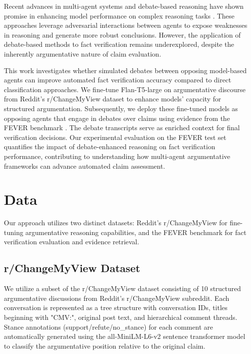 \documentclass[11pt]{article}
\begin{document}
Recent advances in multi-agent systems and debate-based reasoning have shown promise in enhancing model performance on complex reasoning tasks \cite{du2023improving, liang2023encouraging}. These approaches leverage adversarial interactions between agents to expose weaknesses in reasoning and generate more robust conclusions. However, the application of debate-based methods to fact verification remains underexplored, despite the inherently argumentative nature of claim evaluation.

This work investigates whether simulated debates between opposing model-based agents can improve automated fact verification accuracy compared to direct classification approaches. We fine-tune Flan-T5-large \cite{t5} on argumentative discourse from Reddit's r/ChangeMyView dataset \cite{winarg} to enhance models' capacity for structured argumentation. Subsequently, we deploy these fine-tuned models as opposing agents that engage in debates over claims using evidence from the FEVER benchmark \cite{FEVER}. The debate transcripts serve as enriched context for final verification decisions. Our experimental evaluation on the FEVER test set quantifies the impact of debate-enhanced reasoning on fact verification performance, contributing to understanding how multi-agent argumentative frameworks can advance automated claim assessment.

\section{Data}

Our approach utilizes two distinct datasets: Reddit's r/ChangeMyView for fine-tuning argumentative reasoning capabilities, and the FEVER benchmark for fact verification evaluation and evidence retrieval.

\subsection{r/ChangeMyView Dataset}

We utilize a subset of the r/ChangeMyView dataset \cite{winarg} consisting of 10 structured argumentative discussions from Reddit's r/ChangeMyView subreddit. Each conversation is represented as a tree structure with conversation IDs, titles beginning with "CMV:", original post text, and hierarchical comment threads. Stance annotations (support/refute/no\_stance) for each comment are automatically generated using the all-MiniLM-L6-v2 sentence transformer model \cite{reimers2019sentence} to classify the argumentative position relative to the original claim.
\end{document}
